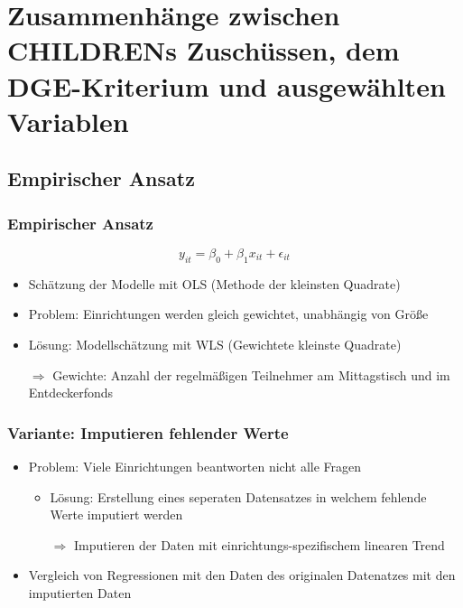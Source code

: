 \section[Zusammenhänge]{Zusammenhänge zwischen CHILDRENs Zuschüssen, dem DGE-Kriterium und ausgewählten Variablen}

\subsection{Empirischer Ansatz}

\begin{frame}
\frametitle{Empirischer Ansatz}

\begin{equation}
\label{SimpleLinearModel}
  y_{it} = \beta_0 + \beta_1 x_{it} + \epsilon_{it}
\end{equation}

\begin{itemize}
\item Schätzung der Modelle mit OLS (Methode der kleinsten Quadrate)
\item Problem: Einrichtungen werden gleich gewichtet, unabhängig von Größe
\item Lösung: Modellschätzung mit WLS (Gewichtete kleinste Quadrate)
\item [$\Rightarrow$] Gewichte: Anzahl der regelmäßigen Teilnehmer am Mittagstisch und im Entdeckerfonds
\end{itemize}

\end{frame}

\begin{frame}[fragile]
\frametitle{Variante: Imputieren fehlender Werte}
\begin{itemize}
\item Problem: Viele Einrichtungen beantworten nicht alle Fragen
\begin{itemize}
\item Lösung: Erstellung eines seperaten Datensatzes in welchem fehlende Werte imputiert werden
\item [$\Rightarrow$] Imputieren der Daten mit einrichtungs-spezifischem linearen Trend
\end{itemize}
\item Vergleich von Regressionen mit den Daten des originalen Datenatzes mit den imputierten Daten
\end{itemize}
\end{frame}


